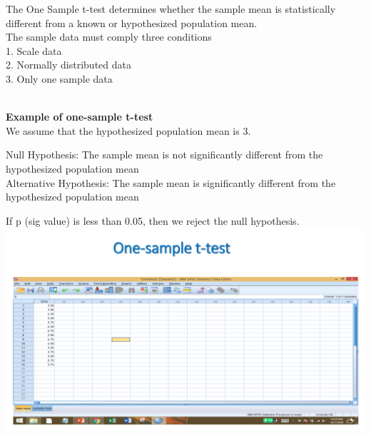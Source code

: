 \documentclass[
  letterpaper,
  DIV=11,
  numbers=noendperiod]{scrreprt}
\begin{document}
{The One Sample t-test determines whether the sample mean is
statistically different from a known or hypothesized population mean.}\\

{The sample data must comply three conditions}\\

{1. Scale data\\
2. Normally distributed data\\
3. Only one sample data\\
}\strut \\

\textbf{Example of one-sample t-test}\\

We assume that the hypothesized population mean is 3.\\

\begin{tcolorbox}[enhanced jigsaw, rightrule=.15mm, arc=.35mm, colframe=quarto-callout-note-color-frame, coltitle=black, left=2mm, colbacktitle=quarto-callout-note-color!10!white, bottomtitle=1mm, titlerule=0mm, colback=white, breakable, opacitybacktitle=0.6, opacityback=0, toprule=.15mm, toptitle=1mm, title=\textcolor{quarto-callout-note-color}{\faInfo}\hspace{0.5em}{Hypothesis}, bottomrule=.15mm, leftrule=.75mm]

Null Hypothesis: The sample mean is not significantly different from the
hypothesized population mean\\
Alternative Hypothesis: The sample mean is significantly different from
the hypothesized population mean\\

\end{tcolorbox}

If p (sig value) is less than 0.05, then we reject the null
hypothesis.\\

\includegraphics{images/slides/img_Page_087.png}
\end{document}
